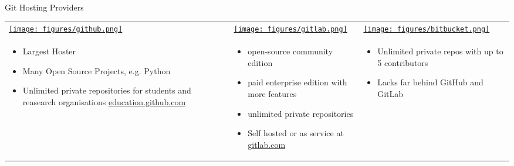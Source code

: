 \begin{frame}[t]{Git Hosting Providers}
  \small
  \begin{tabu}{@{} X[,C] @{} X[,C] @{} X[,C] @{}}
    \href{https://github.com}{\texttt{[image: figures/github.png]}} &
    \href{https://gitlab.com}{\texttt{[image: figures/gitlab.png]}} &
    \href{https://bitbucket.org}{\texttt{[image: figures/bitbucket.png]}} \\
    \begin{itemize}
      \item Largest Hoster
      \item Many Open Source Projects, e.g. Python
      \item Unlimited private repositories for students and reasearch organisations
        \href{https://education.github.com}{education.github.com}
    \end{itemize}
    &
    \begin{itemize}
      \item open-source community edition
      \item paid enterprise edition with more features
      \item unlimited private repositories
      \item Self hosted or as service at \href{https://gitlab.com}{gitlab.com}
    \end{itemize}
    &
    \begin{itemize}
      \item Unlimited private repos with up to 5 contributors
      \item Lacks far behind GitHub and GitLab
    \end{itemize}
  \end{tabu}
  \begin{center}%
  \end{center}%
\end{frame}

